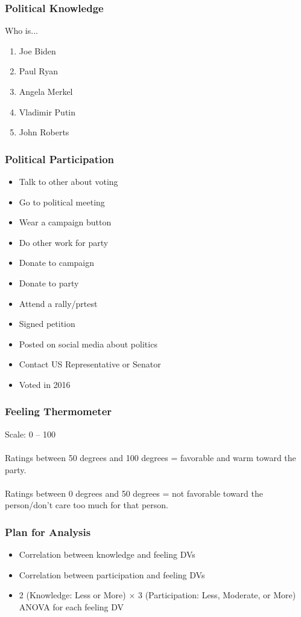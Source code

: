 \documentclass[14pt]{beamer}
\begin{document}
\begin{frame}
\frametitle{Political Knowledge}
Who is...
\begin{enumerate}
	\item Joe Biden
	\item Paul Ryan
	\item Angela Merkel
	\item Vladimir Putin
	\item John Roberts
\end{enumerate}
\end{frame}

\begin{frame}
\small
\frametitle{Political Participation}
\begin{multicols}{2}
\begin{itemize}
	\item Talk to other about voting
	\item Go to political meeting
	\item Wear a campaign button
	\item Do other work for party
	\item Donate to campaign
	\item Donate to party
	\item Attend a rally/prtest
	\item Signed petition
	\item Posted on social media about politics
	\item Contact US Representative or Senator
	\item Voted in 2016
\end{itemize}
\end{multicols}	
\end{frame}

\begin{frame}
\frametitle{Feeling Thermometer}
\begin{center}
	Scale: 0 -- 100 
	~~\\
	~~\\
	Ratings between 50 degrees and 100 degrees  =  favorable and warm toward the party. 
	~~\\
	~~\\
	Ratings between 0 degrees and 50 degrees  = not favorable toward the person/don't care too much for that person.
\end{center}
\end{frame}

\begin{frame}
\frametitle{Plan for Analysis}
\begin{itemize}
	\item Correlation between knowledge and feeling DVs
	\item Correlation between participation and feeling DVs
	\item 2 (Knowledge: Less or More) $\times$ 3 (Participation: Less, Moderate, or More) ANOVA for each feeling DV
\end{itemize}
\end{frame}
\end{document}
